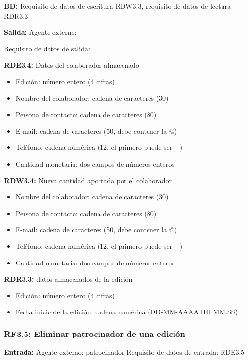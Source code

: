 \textbf{BD:} Requisito de datos de escritura RDW3.3, requisito de datos de lectura RDR3.3

\textbf{Salida:} Agente externo:

Requisito de datos de salida:

\textbf{RDE3.4:} Datos del colaborador almacenado
\begin{itemize}
	\item Edición: número entero (4 cifras)
\newline
	\item Nombre del colaborador: cadena de caracteres (30)
	\item Persona de contacto: cadena de caracteres (80)
	\item E-mail: cadena de caracteres (50, debe contener la @)
	\item Teléfono: cadena numérica (12, el primero puede ser +)
\newline
	\item Cantidad monetaria: dos campos de números enteros
\end{itemize}

\textbf{RDW3.4:} Nueva cantidad aportada por el colaborador
\begin{itemize}
	\item Nombre del colaborador: cadena de caracteres (30)
	\item Persona de contacto: cadena de caracteres (80)
	\item E-mail: cadena de caracteres (50, debe contener la @)
	\item Teléfono: cadena numérica (12, el primero puede ser +)
\newline
	\item Cantidad monetaria: dos campos de números enteros
\end{itemize}

\textbf{RDR3.3:} datos almacenados de la edición
\begin{itemize}
	\item Edición: número entero (4 cifras)
	\item Fecha inicio de la edición: cadena numérica (DD-MM-AAAA HH:MM:SS)
\end{itemize}

\subsubsection{RF3.5: Eliminar patrocinador de una edición}

\textbf{Entrada:} Agente externo: patrocinador     Requisito de datos de entrada: RDE3.5

